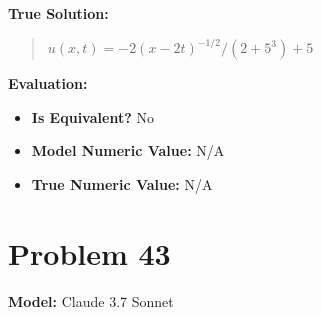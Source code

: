 \documentclass{article}
\begin{document}
\textbf{True Solution:}
\begin{quote}
$u(x,t)=-2(x-2t)^{-1/2}/(2+5^3)+5$
\end{quote}

\textbf{Evaluation:}
\begin{itemize}
\item \textbf{Is Equivalent?} No
\item \textbf{Model Numeric Value:} N/A
\item \textbf{True Numeric Value:} N/A
\end{itemize}
\vspace{1cm}
\section*{Problem 43}
\textbf{Model:} Claude 3.7 Sonnet
\end{document}
